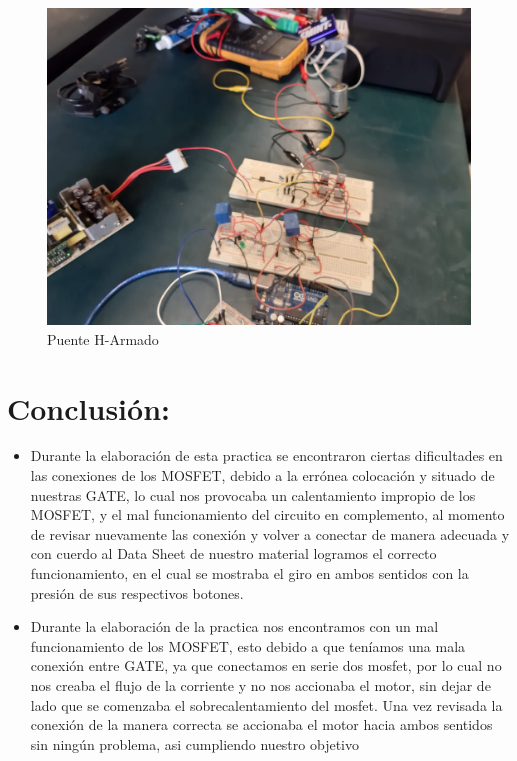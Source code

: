 \documentclass[12pt,letterpaper]{article}
\begin{document}
\begin{itemize}
\
\begin{figure}[h!]
\begin{center}
\includegraphics[scale=0.2]{Circuito2.jpeg}

\caption{Puente H-Armado}
\end{center}
\end{figure}
\end{itemize}

\section{Conclusión:}
\begin{itemize}

\item Durante la elaboración de esta practica se encontraron ciertas dificultades en las conexiones de los MOSFET, debido a la errónea colocación y situado de nuestras GATE, lo cual nos provocaba un calentamiento impropio de los MOSFET, y el mal funcionamiento del circuito en complemento, al momento de revisar nuevamente las conexión y volver a conectar de manera adecuada y con cuerdo al Data Sheet de nuestro material logramos el correcto funcionamiento, en el cual se mostraba el giro en ambos sentidos con la presión de sus respectivos botones.
\item  Durante la elaboración de la practica nos encontramos con un mal funcionamiento de los MOSFET, esto debido a que teníamos una mala conexión entre GATE, ya que conectamos en serie dos mosfet, por lo cual no nos creaba el flujo de la corriente y no nos accionaba el motor, sin dejar de lado que se comenzaba el sobrecalentamiento del mosfet. Una vez revisada la conexión de la manera correcta se accionaba el motor hacia ambos sentidos sin ningún problema, asi cumpliendo nuestro objetivo
\end{itemize}
\end{document}
